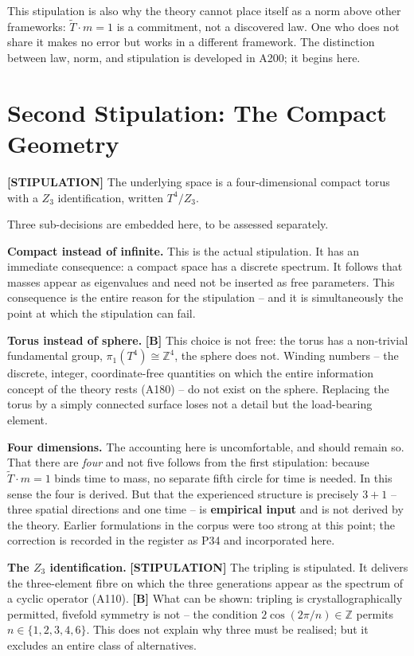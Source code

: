 This stipulation is also why the theory cannot place itself as a norm above
other frameworks: $\tilde T\cdot m = 1$ is a commitment, not a discovered
law. One who does not share it makes no error but works in a different
framework. The distinction between law, norm, and stipulation is developed
in A200; it begins here.

\section{Second Stipulation: The Compact Geometry}

\textbf{[STIPULATION]} The underlying space is a four-dimensional compact
torus with a $Z_3$ identification, written $T^4/Z_3$.

Three sub-decisions are embedded here, to be assessed separately.

\textbf{Compact instead of infinite.} This is the actual stipulation. It has
an immediate consequence: a compact space has a discrete spectrum. It follows
that masses appear as eigenvalues and need not be inserted as free parameters.
This consequence is the entire reason for the stipulation -- and it is
simultaneously the point at which the stipulation can fail.

\textbf{Torus instead of sphere.} \textbf{[B]} This choice is not free: the
torus has a non-trivial fundamental group, $\pi_1(T^4) \cong \mathbb{Z}^4$,
the sphere does not. Winding numbers -- the discrete, integer, coordinate-free
quantities on which the entire information concept of the theory rests (A180)
-- do not exist on the sphere. Replacing the torus by a simply connected
surface loses not a detail but the load-bearing element.

\textbf{Four dimensions.} The accounting here is uncomfortable, and should
remain so. That there are \emph{four} and not five follows from the first
stipulation: because $\tilde T\cdot m = 1$ binds time to mass, no separate
fifth circle for time is needed. In this sense the four is derived. But that
the experienced structure is precisely $3+1$ -- three spatial directions and
one time -- is \textbf{empirical input} and is not derived by the theory.
Earlier formulations in the corpus were too strong at this point; the
correction is recorded in the register as P34 and incorporated here.

\textbf{The $Z_3$ identification.} \textbf{[STIPULATION]} The tripling is
stipulated. It delivers the three-element fibre on which the three generations
appear as the spectrum of a cyclic operator (A110). \textbf{[B]} What can be
shown: tripling is crystallographically permitted, fivefold symmetry is not --
the condition $2\cos(2\pi/n) \in \mathbb{Z}$ permits $n \in \{1,2,3,4,6\}$.
This does not explain why three must be realised; but it excludes an entire
class of alternatives.

